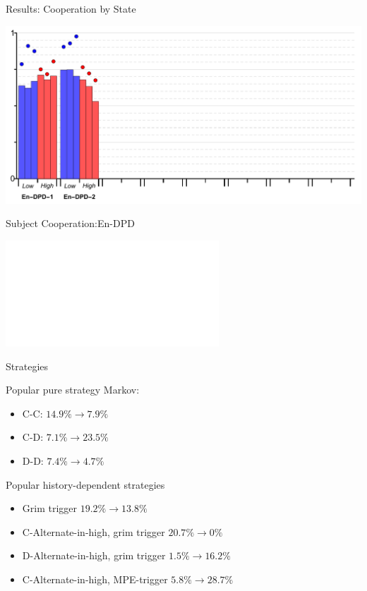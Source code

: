 \documentclass{beamer}
\begin{document}
\begin{frame}{Results: Cooperation by State}
\begin{card}
\begin{center}
	\includegraphics[width=1.0\textwidth]{./i/col_bar_StateCoop_block_EnDPD_2.pdf}
\end{center}

\end{card}
\end{frame}

\begin{frame}{Subject Cooperation:En-DPD }
\begin{card}
\begin{center}
	\includegraphics<2>[width=0.6\textwidth]{./i/col_subject_stateCooperation_L5_EnDPD_2.pdf}
\end{center}
\end{card}
\end{frame}

\begin{frame}{Strategies}
\begin{card}
Popular pure strategy Markov:

\begin{itemize}
\item C-C: $14.9\%\rightarrow7.9\%$
\item C-D: $7.1\%\rightarrow23.5\%$
\item D-D: $7.4\%\rightarrow4.7\%$
\end{itemize}
\end{card}

\begin{card} Popular history-dependent strategies
\begin{itemize}
\item Grim trigger $19.2\%\rightarrow13.8\%$
\item C-Alternate-in-high, grim trigger $20.7\%\rightarrow0\%$
\item D-Alternate-in-high, grim trigger $1.5\%\rightarrow16.2\%$
\item C-Alternate-in-high, MPE-trigger $5.8\%\rightarrow28.7\%$
\end{itemize}
\end{card}
\end{frame}
\end{document}

